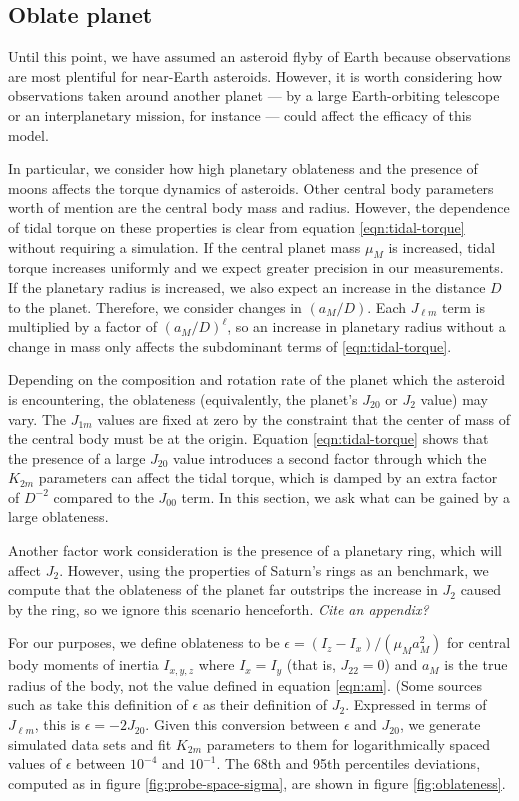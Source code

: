 \documentclass{aastex631}
\newcommand{\jtd}[1]{{\color{red}\textit{#1}}}
\begin{document}
\subsection{Oblate planet}


Until this point, we have assumed an asteroid flyby of Earth because observations are most plentiful for near-Earth asteroids. However, it is worth considering how observations taken around another planet --- by a large Earth-orbiting telescope or an interplanetary mission, for instance --- could affect the efficacy of this model.

In particular, we consider how high planetary oblateness and the presence of moons affects the torque dynamics of asteroids. Other central body parameters worth of mention are the central body mass and radius. However, the dependence of tidal torque on these properties is clear from equation \ref{eqn:tidal-torque} without requiring a simulation. If the central planet mass $\mu_M$ is increased, tidal torque increases uniformly and we expect greater precision in our measurements. If the planetary radius is increased, we also expect an increase in the distance $D$ to the planet. Therefore, we consider changes in $(a_M/D)$. Each $J_{\ell m}$ term is multiplied by a factor of $(a_M/D)^\ell$, so an increase in planetary radius without a change in mass only affects the subdominant terms of \ref{eqn:tidal-torque}.

Depending on the composition and rotation rate of the planet which the asteroid is encountering, the oblateness (equivalently, the planet's $J_{20}$ or $J_2$ value) may vary. The $J_{1m}$ values are fixed at zero by the constraint that the center of mass of the central body must be at the origin. Equation \ref{eqn:tidal-torque} shows that the presence of a large $J_{20}$ value introduces a second factor through which the $K_{2m}$ parameters can affect the tidal torque, which is damped by an extra factor of $D^{-2}$ compared to the $J_{00}$ term. In this section, we ask what can be gained by a large oblateness.

Another factor work consideration is the presence of a planetary ring, which will affect $J_{2}$. However, using the properties of Saturn's rings as an benchmark, we compute that the oblateness of the planet far outstrips the increase in $J_{2}$ caused by the ring, so we ignore this scenario henceforth. \jtd{Cite an appendix?}

For our purposes, we define oblateness to be $\epsilon = (I_z - I_x)/(\mu_M a_M^2)$ for central body moments of inertia $I_{x,y,z}$ where $I_x = I_y$ (that is, $J_{22} = 0$) and $a_M$ is the true radius of the body, not the value defined in equation \ref{eqn:am}. (Some sources such as \cite{pater_lissauer_2015} take this definition of $\epsilon$ as their definition of $J_2$. Expressed in terms of $J_{\ell m}$, this is $\epsilon = -2J_{20}$. Given this conversion between $\epsilon$ and $J_{20}$, we generate simulated data sets and fit $K_{2m}$ parameters to them for logarithmically spaced values of $\epsilon$ between $10^{-4}$ and $10^{-1}$. The 68th and 95th percentiles deviations, computed as in figure \ref{fig:probe-space-sigma}, are shown in figure \ref{fig:oblateness}.
\end{document}
